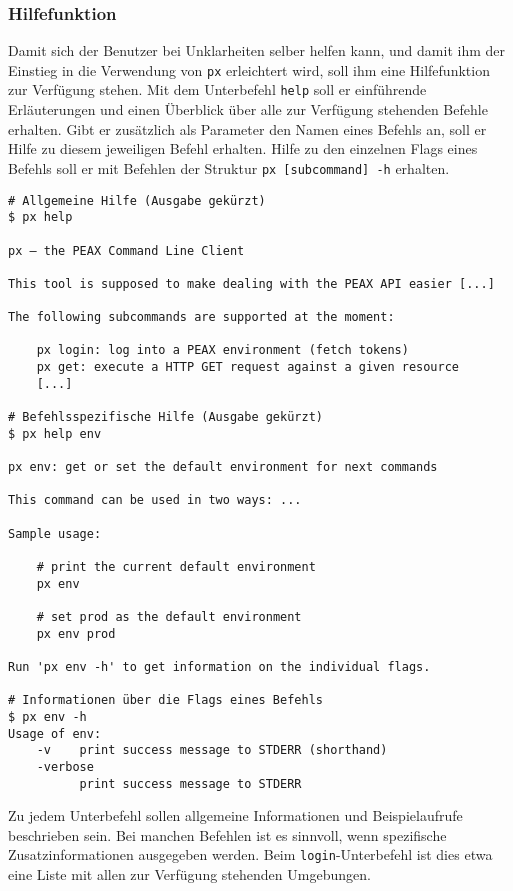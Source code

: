 \subsubsection{Hilfefunktion}

Damit sich der Benutzer bei Unklarheiten selber helfen kann, und damit ihm der Einstieg in die Verwendung von \texttt{px} erleichtert wird, soll ihm eine Hilfefunktion zur Verfügung stehen. Mit dem Unterbefehl \texttt{help} soll er einführende Erläuterungen und einen Überblick über alle zur Verfügung stehenden Befehle erhalten. Gibt er zusätzlich als Parameter den Namen eines Befehls an, soll er Hilfe zu diesem jeweiligen Befehl erhalten. Hilfe zu den einzelnen Flags eines Befehls soll er mit Befehlen der Struktur \texttt{px [subcommand] -h} erhalten.

\begin{lstlisting}[caption={Verwendung der Hilfefunktion}]
# Allgemeine Hilfe (Ausgabe gekürzt)
$ px help

px ‒ the PEAX Command Line Client

This tool is supposed to make dealing with the PEAX API easier [...]

The following subcommands are supported at the moment:

    px login: log into a PEAX environment (fetch tokens)
    px get: execute a HTTP GET request against a given resource
    [...]

# Befehlsspezifische Hilfe (Ausgabe gekürzt)
$ px help env

px env: get or set the default environment for next commands

This command can be used in two ways: ...

Sample usage:

    # print the current default environment
    px env

    # set prod as the default environment
    px env prod

Run 'px env -h' to get information on the individual flags.

# Informationen über die Flags eines Befehls
$ px env -h
Usage of env:
    -v    print success message to STDERR (shorthand)
    -verbose
          print success message to STDERR
\end{lstlisting}

Zu jedem Unterbefehl sollen allgemeine Informationen und Beispielaufrufe beschrieben sein. Bei manchen Befehlen ist es sinnvoll, wenn spezifische Zusatzinformationen ausgegeben werden. Beim \texttt{login}-Unterbefehl ist dies etwa eine Liste mit allen zur Verfügung stehenden Umgebungen.

